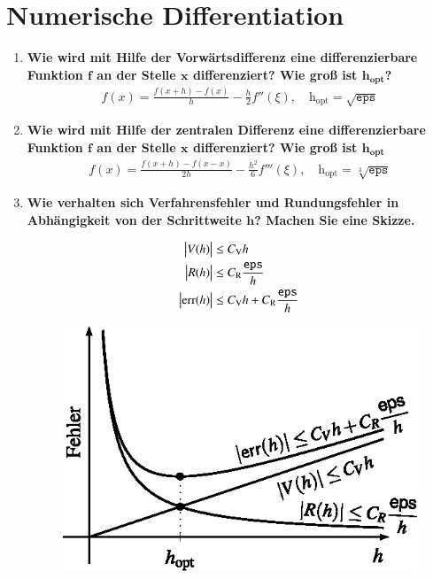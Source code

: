 \section{Numerische Differentiation}
	\begin{enumerate}
		\item \textbf{Wie wird mit Hilfe der Vorwärtsdifferenz eine differenzierbare Funktion \(\mathbf{f}\) an der Stelle \(\mathbf{x}\) differenziert? Wie groß ist \(\mathbf{\text{h}_{\text{opt}}}\)?}
			\begin{align*}
				f(x)=\frac{f(x+h)-f(x)}{h}-\frac{h}{2}f''(\xi), \quad \text{h}_{\text{opt}}=\sqrt{\texttt{eps}}
			\end{align*}
		\item \textbf{Wie wird mit Hilfe der zentralen Differenz eine differenzierbare Funktion \(\mathbf{f}\) an der Stelle \(\mathbf{x}\) differenziert? Wie groß ist \(\mathbf{\text{h}_{\text{opt}}}\)}
			\begin{align*}
				f(x)=\frac{f(x+h)-f(x-x)}{2h}-\frac{h^2}{6}f'''(\xi), \quad \text{h}_{\text{opt}}=\sqrt[3]{\texttt{eps}}
			\end{align*}
		\item \textbf{Wie verhalten sich Verfahrensfehler und Rundungsfehler in Abhängigkeit von der Schrittweite \(\mathbf{h}\)? Machen Sie eine Skizze.}
			\begin{figure}[!htbp]
				\centering				
				\begin{minipage}{.4\textwidth}
					\centering
					\begin{align*}
						\abs{V(h)}&\leq C_\text{V} h \\
						\abs{R(h)}&\leq C_\text{R} \frac{\texttt{eps}}{h} \\
						\abs{\text{err}(h)}&\leq C_\text{V} h + C_\text{R} \frac{\texttt{eps}}{h}
					\end{align*}
				\end{minipage} %
				\begin{minipage}{.5\textwidth}
					\centering
					\includegraphics[width=0.8\linewidth]{Kap2_1}

\end{minipage}
\end{figure}
\end{enumerate}
